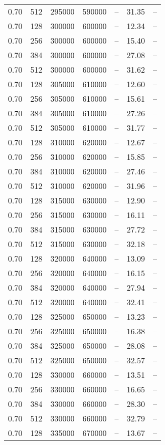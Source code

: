 \begin{tabular}{l|l|l|l|l|l|l}
0.70 & 512 & 295000 & 590000 & -- & 31.35 & --\\
0.70 & 128 & 300000 & 600000 & -- & 12.34 & --\\
0.70 & 256 & 300000 & 600000 & -- & 15.40 & --\\
0.70 & 384 & 300000 & 600000 & -- & 27.08 & --\\
0.70 & 512 & 300000 & 600000 & -- & 31.62 & --\\
0.70 & 128 & 305000 & 610000 & -- & 12.60 & --\\
0.70 & 256 & 305000 & 610000 & -- & 15.61 & --\\
0.70 & 384 & 305000 & 610000 & -- & 27.26 & --\\
0.70 & 512 & 305000 & 610000 & -- & 31.77 & --\\
0.70 & 128 & 310000 & 620000 & -- & 12.67 & --\\
0.70 & 256 & 310000 & 620000 & -- & 15.85 & --\\
0.70 & 384 & 310000 & 620000 & -- & 27.46 & --\\
0.70 & 512 & 310000 & 620000 & -- & 31.96 & --\\
0.70 & 128 & 315000 & 630000 & -- & 12.90 & --\\
0.70 & 256 & 315000 & 630000 & -- & 16.11 & --\\
0.70 & 384 & 315000 & 630000 & -- & 27.72 & --\\
0.70 & 512 & 315000 & 630000 & -- & 32.18 & --\\
0.70 & 128 & 320000 & 640000 & -- & 13.09 & --\\
0.70 & 256 & 320000 & 640000 & -- & 16.15 & --\\
0.70 & 384 & 320000 & 640000 & -- & 27.94 & --\\
0.70 & 512 & 320000 & 640000 & -- & 32.41 & --\\
0.70 & 128 & 325000 & 650000 & -- & 13.23 & --\\
0.70 & 256 & 325000 & 650000 & -- & 16.38 & --\\
0.70 & 384 & 325000 & 650000 & -- & 28.08 & --\\
0.70 & 512 & 325000 & 650000 & -- & 32.57 & --\\
0.70 & 128 & 330000 & 660000 & -- & 13.51 & --\\
0.70 & 256 & 330000 & 660000 & -- & 16.65 & --\\
0.70 & 384 & 330000 & 660000 & -- & 28.30 & --\\
0.70 & 512 & 330000 & 660000 & -- & 32.79 & --\\
0.70 & 128 & 335000 & 670000 & -- & 13.67 & --\\

\end{tabular}
